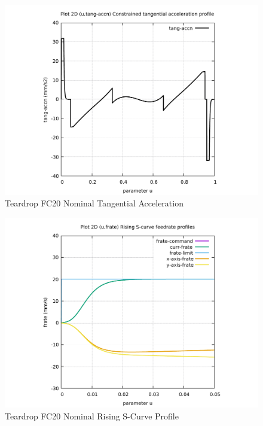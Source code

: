 \begin{figure}
	\caption     {Teardrop FC20 Nominal Tangential Acceleration}
	\label{14-img-Teardrop-FC20-Nominal-Tangential-Acceleration.pdf}
	\includegraphics[width=1.00\textwidth]{Chap4/appendix/app-Teardrop/plots/14-img-Teardrop-FC20-Nominal-Tangential-Acceleration.pdf}
\end{figure}

\clearpage
\pagebreak

\begin{figure}
	\caption     {Teardrop FC20 Nominal Rising S-Curve Profile}
	\label{15-img-Teardrop-FC20-Nominal-Rising-S-Curve-Profile.pdf}
	\includegraphics[width=1.00\textwidth]{Chap4/appendix/app-Teardrop/plots/15-img-Teardrop-FC20-Nominal-Rising-S-Curve-Profile.pdf}
\end{figure}


